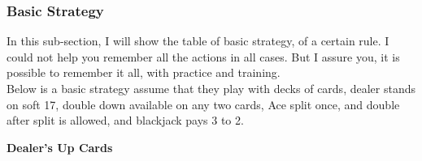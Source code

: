 \documentclass{article}
\begin{document}
\subsubsection{Basic Strategy}
In this sub-section, I will show the table of basic strategy, of a certain rule.  I could not help you remember all the actions in all cases.  But I assure you, it is possible to remember it all, with practice and training.\\

Below is a basic strategy assume that they play with \infty decks of cards, dealer stands on soft 17, double down available on any two cards, Ace split once, and double after split is allowed, and blackjack pays 3 to 2.\\

\clearpage
\begin{table}[htb]
\centering
\textbf{Dealer's Up Cards}\\
\begin{tabular}{|c|c|c|c|c|c|c|c|c|c|c|}


\end{tabular}
\end{table}
\end{document}
